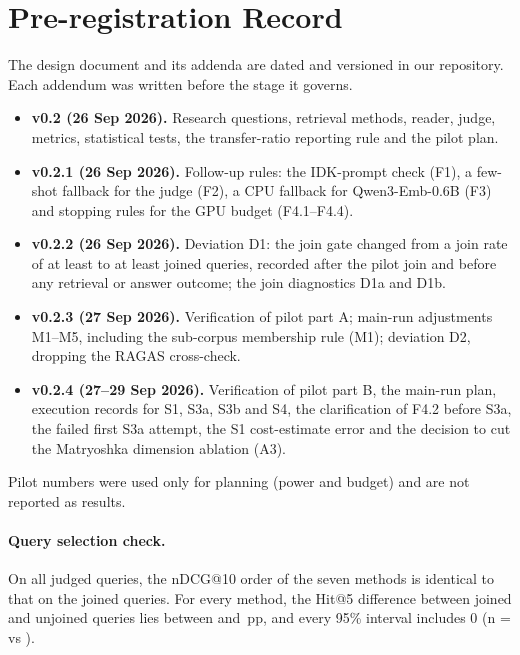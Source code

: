 \section{Pre-registration Record}
\label{app:prereg}
The design document and its addenda are dated and versioned in our repository.
Each addendum was written before the stage it governs.
\begin{itemize}
\item \textbf{v0.2 (26 Sep 2026).} Research questions, retrieval methods, reader, judge, metrics, statistical tests, the transfer-ratio reporting rule and the pilot plan.
\item \textbf{v0.2.1 (26 Sep 2026).} Follow-up rules: the IDK-prompt check (F1), a few-shot fallback for the judge (F2), a CPU fallback for Qwen3-Emb-0.6B (F3) and stopping rules for the GPU budget (F4.1--F4.4).
\item \textbf{v0.2.2 (26 Sep 2026).} Deviation D1: the join gate changed from a join rate of at least  to at least  joined queries, recorded after the pilot join and before any retrieval or answer outcome; the join diagnostics D1a and D1b.
\item \textbf{v0.2.3 (27 Sep 2026).} Verification of pilot part A; main-run adjustments M1--M5, including the sub-corpus membership rule (M1); deviation D2, dropping the RAGAS cross-check.
\item \textbf{v0.2.4 (27--29 Sep 2026).} Verification of pilot part B, the main-run plan, execution records for S1, S3a, S3b and S4, the clarification of F4.2 before S3a, the failed first S3a attempt, the S1 cost-estimate error and the decision to cut the Matryoshka dimension ablation (A3).
\end{itemize}
Pilot numbers were used only for planning (power and budget) and are not reported as results.

\paragraph{Query selection check.} On all  judged queries, the nDCG@10 order of the seven methods is identical to that on the  joined queries. For every method, the Hit@5 difference between joined and unjoined queries lies between  and \,pp, and every 95\% interval includes 0 (n =  vs ).

